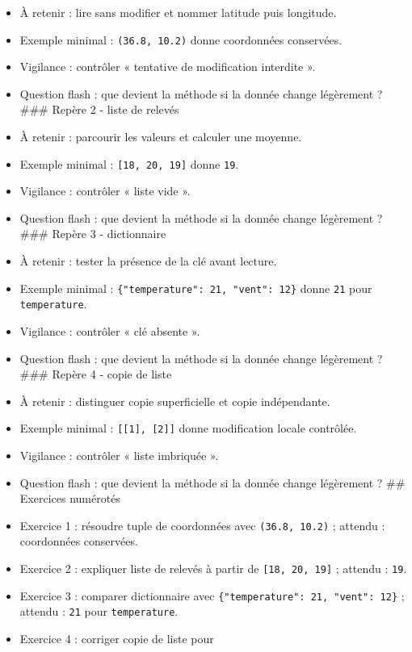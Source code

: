 \begin{itemize}
\tightlist
\item
  À retenir : lire sans modifier et nommer latitude puis longitude.
\item
  Exemple minimal : \texttt{(36.8,\ 10.2)} donne coordonnées conservées.
\item
  Vigilance : contrôler « tentative de modification interdite ».
\item
  Question flash : que devient la méthode si la donnée change légèrement
  ? \#\#\# Repère 2 - liste de relevés
\item
  À retenir : parcourir les valeurs et calculer une moyenne.
\item
  Exemple minimal : \texttt{{[}18,\ 20,\ 19{]}} donne \texttt{19}.
\item
  Vigilance : contrôler « liste vide ».
\item
  Question flash : que devient la méthode si la donnée change légèrement
  ? \#\#\# Repère 3 - dictionnaire
\item
  À retenir : tester la présence de la clé avant lecture.
\item
  Exemple minimal : \texttt{\{"temperature":\ 21,\ "vent":\ 12\}} donne
  \texttt{21} pour \texttt{temperature}.
\item
  Vigilance : contrôler « clé absente ».
\item
  Question flash : que devient la méthode si la donnée change légèrement
  ? \#\#\# Repère 4 - copie de liste
\item
  À retenir : distinguer copie superficielle et copie indépendante.
\item
  Exemple minimal : \texttt{{[}{[}1{]},\ {[}2{]}{]}} donne modification
  locale contrôlée.
\item
  Vigilance : contrôler « liste imbriquée ».
\item
  Question flash : que devient la méthode si la donnée change légèrement
  ? \#\# Exercices numérotés
\item
  Exercice 1 : résoudre tuple de coordonnées avec \texttt{(36.8,\ 10.2)}
  ; attendu : coordonnées conservées.
\item
  Exercice 2 : expliquer liste de relevés à partir de
  \texttt{{[}18,\ 20,\ 19{]}} ; attendu : \texttt{19}.
\item
  Exercice 3 : comparer dictionnaire avec
  \texttt{\{"temperature":\ 21,\ "vent":\ 12\}} ; attendu : \texttt{21}
  pour \texttt{temperature}.
\item
  Exercice 4 : corriger copie de liste pour

\end{itemize}
